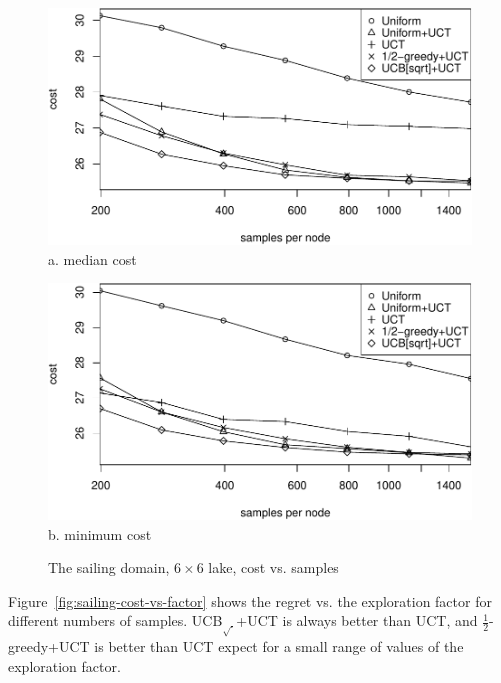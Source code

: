 \documentclass[letterpaper]{article}
\begin{document}
\begin{figure}[h!]
  \begin{minipage}[b]{1.0\linewidth}
    \centering
    \includegraphics[scale=0.425]{costs-size=6-group=median.pdf}\\
    a. median cost
    \vspace{0.5em}
  \end{minipage}
  \begin{minipage}[b]{1.0\linewidth}
    \centering
    \includegraphics[scale=0.425]{costs-size=6-group=minimum.pdf}\\
    b. minimum cost
  \end{minipage}
  \caption{The sailing domain, $6\times 6$ lake, cost vs. samples}
  \label{fig:sailing-cost-vs-nsamples}
\end{figure}

Figure~\ref{fig:sailing-cost-vs-factor} shows the regret vs. the
exploration factor for different numbers of samples. UCB$_{\sqrt{\cdot}}$+UCT is always better than
UCT, and $\frac 1 2$-greedy+UCT is better than UCT expect for a small range of
values of the exploration factor. 
\end{document}
